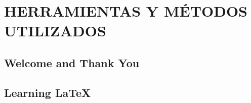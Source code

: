 
\chapter{HERRAMIENTAS Y M\'ETODOS UTILIZADOS} %

\label{Chapter3} %

\section{Welcome and Thank You}


\section{Learning \LaTeX{}}